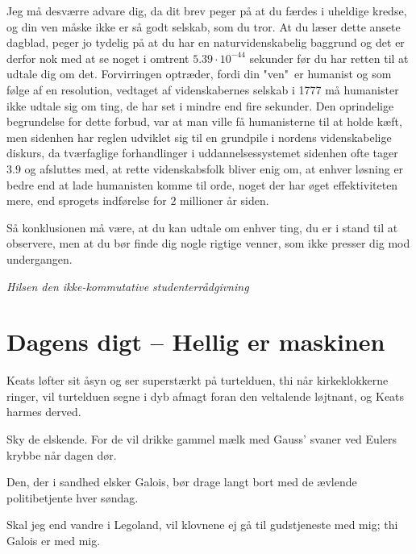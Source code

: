 \begin{minipage}[t]{170mm}
Jeg må desværre advare dig, da dit brev peger på at du færdes i uheldige kredse, og din ven måske ikke er så godt selskab, som du tror. At du læser dette ansete dagblad, peger jo tydelig på at du har en naturvidenskabelig baggrund og det er derfor nok med at se noget i omtrent $5.39 \cdot 10^{-44}$ sekunder før du har retten til at udtale dig om det. Forvirringen optræder, fordi din "ven"\ er humanist og som følge af en resolution, vedtaget af videnskabernes selskab i 1777 må humanister ikke udtale sig om ting, de har set i mindre end fire sekunder. Den oprindelige begrundelse for dette forbud, var at man ville få humanisterne til at holde kæft, men sidenhen har reglen udviklet sig til en grundpile i nordens videnskabelige diskurs, da tværfaglige forhandlinger i uddannelsessystemet sidenhen ofte tager $3.9$ og afsluttes med, at rette videnskabsfolk bliver enig om, at enhver løsning er bedre end at lade humanisten komme til orde, noget der har øget effektiviteten mere, end sprogets indførelse for $2$ millioner år siden. 

Så konklusionen må være, at du kan udtale om enhver ting, du er i stand til at observere, men at du bør finde dig nogle rigtige venner, som ikke presser dig mod undergangen.

{\flushright\emph{Hilsen den ikke-kommutative studenterrådgivning}}

\vspace{1mm}

\section*{Dagens digt -- Hellig er maskinen}
\begin{center}
Keats løfter sit åsyn og ser superstærkt på turtelduen, thi når kirkeklokkerne ringer, vil turtelduen segne i dyb afmagt foran den veltalende løjtnant, og Keats harmes derved.

Sky de elskende. For de vil drikke gammel mælk med Gauss' svaner ved Eulers krybbe når dagen dør.

Den, der i sandhed elsker Galois, bør drage langt bort med de ævlende politibetjente hver søndag.

Skal jeg end vandre i Legoland, vil klovnene ej gå til gudstjeneste med mig; thi Galois er med mig.
\end{center}

\end{minipage}
